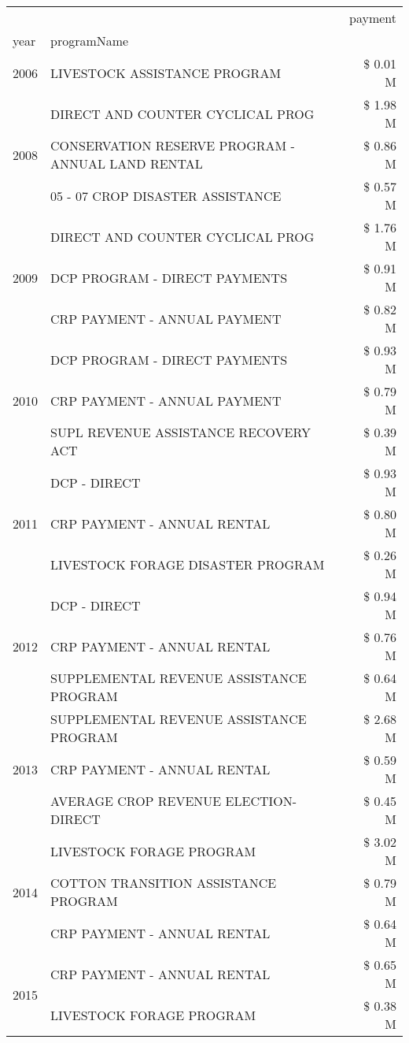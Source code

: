 \begin{tabular}{llr}
\toprule
 &  & payment \\
year & programName &  \\
\midrule
2006 & LIVESTOCK ASSISTANCE PROGRAM & \$ 0.01 M \\
\cline{1-3}
\multirow[t]{3}{*}{2008} & DIRECT AND COUNTER CYCLICAL PROG & \$ 1.98 M \\
 & CONSERVATION RESERVE PROGRAM - ANNUAL LAND RENTAL & \$ 0.86 M \\
 & 05 - 07 CROP DISASTER ASSISTANCE & \$ 0.57 M \\
\cline{1-3}
\multirow[t]{3}{*}{2009} & DIRECT AND COUNTER CYCLICAL PROG & \$ 1.76 M \\
 & DCP PROGRAM - DIRECT PAYMENTS & \$ 0.91 M \\
 & CRP PAYMENT - ANNUAL PAYMENT & \$ 0.82 M \\
\cline{1-3}
\multirow[t]{3}{*}{2010} & DCP PROGRAM - DIRECT PAYMENTS & \$ 0.93 M \\
 & CRP PAYMENT - ANNUAL PAYMENT & \$ 0.79 M \\
 & SUPL REVENUE ASSISTANCE RECOVERY ACT & \$ 0.39 M \\
\cline{1-3}
\multirow[t]{3}{*}{2011} & DCP - DIRECT & \$ 0.93 M \\
 & CRP PAYMENT - ANNUAL RENTAL & \$ 0.80 M \\
 & LIVESTOCK FORAGE DISASTER PROGRAM & \$ 0.26 M \\
\cline{1-3}
\multirow[t]{3}{*}{2012} & DCP - DIRECT & \$ 0.94 M \\
 & CRP PAYMENT - ANNUAL RENTAL & \$ 0.76 M \\
 & SUPPLEMENTAL REVENUE ASSISTANCE PROGRAM & \$ 0.64 M \\
\cline{1-3}
\multirow[t]{3}{*}{2013} & SUPPLEMENTAL REVENUE ASSISTANCE PROGRAM & \$ 2.68 M \\
 & CRP PAYMENT - ANNUAL RENTAL & \$ 0.59 M \\
 & AVERAGE CROP REVENUE ELECTION-DIRECT & \$ 0.45 M \\
\cline{1-3}
\multirow[t]{3}{*}{2014} & LIVESTOCK FORAGE PROGRAM & \$ 3.02 M \\
 & COTTON TRANSITION ASSISTANCE PROGRAM & \$ 0.79 M \\
 & CRP PAYMENT - ANNUAL RENTAL & \$ 0.64 M \\
\cline{1-3}
\multirow[t]{3}{*}{2015} & CRP PAYMENT - ANNUAL RENTAL & \$ 0.65 M \\
 & LIVESTOCK FORAGE PROGRAM & \$ 0.38 M \\

\end{tabular}
